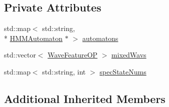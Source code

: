 \subsection*{Private Attributes}
\begin{DoxyCompactItemize}
\item 
std\+::map$<$ std\+::string, \\*
\hyperlink{class_h_m_m_automaton}{H\+M\+M\+Automaton} $\ast$ $>$ \hyperlink{class_h_m_m_automaton_set_ae35f541c8b78e3cdca06f20df905aeda}{automatons}
\item 
std\+::vector$<$ \hyperlink{class_wave_feature_o_p}{Wave\+Feature\+O\+P} $>$ \hyperlink{class_h_m_m_automaton_set_a255954d8bebfd64588f72f8b1fa13b1b}{mixed\+Wavs}
\item 
std\+::map$<$ std\+::string, int $>$ \hyperlink{class_h_m_m_automaton_set_a331349a05f8ada38dc5704a214ecb044}{spec\+State\+Nums}
\end{DoxyCompactItemize}
\subsection*{Additional Inherited Members}


